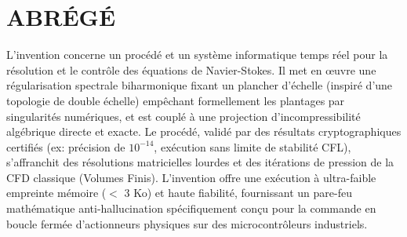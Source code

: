 \documentclass[11pt,a4paper]{article}
\begin{document}
\section{ABRÉGÉ}
L'invention concerne un procédé et un système informatique temps réel pour la résolution et le contrôle des équations de Navier-Stokes. Il met en œuvre une régularisation spectrale biharmonique fixant un plancher d'échelle (inspiré d'une topologie de double échelle) empêchant formellement les plantages par singularités numériques, et est couplé à une projection d'incompressibilité algébrique directe et exacte. Le procédé, validé par des résultats cryptographiques certifiés (ex: précision de $10^{-14}$, exécution sans limite de stabilité CFL), s'affranchit des résolutions matricielles lourdes et des itérations de pression de la CFD classique (Volumes Finis). L'invention offre une exécution à ultra-faible empreinte mémoire ($<$ 3 Ko) et haute fiabilité, fournissant un pare-feu mathématique anti-hallucination spécifiquement conçu pour la commande en boucle fermée d'actionneurs physiques sur des microcontrôleurs industriels.
\end{document}
